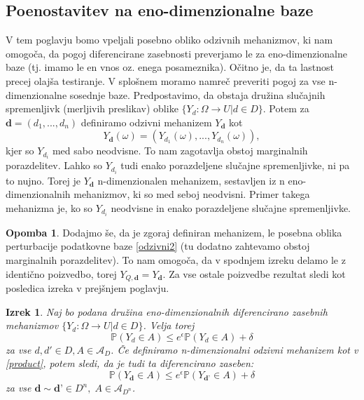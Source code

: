 \documentclass[12pt,a4paper]{amsart}
\theoremstyle{definition} %
\newtheorem{opomba}[definicija]{Opomba}
\theoremstyle{plain} %
\newtheorem{izrek}[definicija]{Izrek}
\begin{document}
\subsection{Poenostavitev na eno-dimenzionalne baze}
V tem poglavju bomo vpeljali posebno obliko odzivnih mehanizmov, ki nam omogoča, da pogoj diferencirane zasebnosti preverjamo le za eno-dimenzionalne baze (tj. imamo le en vnos oz. enega posameznika). Očitno je, da ta lastnost precej olajša testiranje. V splošnem moramo namreč preveriti pogoj za vse n-dimenzionalne sosednje baze.
\newline
\newline
Predpostavimo, da obstaja družina slučajnih spremenljivk (merljivih preslikav) oblike $\{ Y_d: \Omega \rightarrow U | d \in D\}$.  Potem za $\textbf{d} = (d_1,...,d_n)$ definiramo odzivni mehanizem $Y_{\textbf{d}}$ kot  
\begin{equation}\label{product}
Y_{\textbf{d}} (\omega) = (Y_{d_1} (\omega) , ... , Y_{d_n} (\omega)), \tag{5}
\end{equation}
kjer so $Y_{d_i}$ med sabo neodvisne. To nam zagotavlja obstoj marginalnih porazdelitev.  Lahko so $Y_{d_i}$ tudi enako porazdeljene slučajne spremenljivke, ni pa to nujno. Torej je $Y_{\textbf{d}}$ n-dimenzionalen mehanizem, sestavljen iz n eno-dimenzionalnih mehanizmov, ki so med seboj neodvisni. Primer takega mehanizma je, ko so $Y_{d_i}$ neodvisne in enako porazdeljene slučajne spremenljivke.
\newline
\newline
\begin{opomba} Dodajmo še, da je zgoraj definiran mehanizem, le posebna oblika perturbacije podatkovne baze \eqref{odzivni2} (tu dodatno zahtevamo obstoj marginalnih porazdelitev). To nam omogoča, da v spodnjem izreku delamo le z identično poizvedbo, torej $Y_{Q, \textbf{d}}=Y_{\textbf{d}}$. Za vse ostale poizvedbe rezultat sledi kot posledica izreka v prejšnjem poglavju. 
\end{opomba}
\begin{izrek} Naj bo podana družina eno-dimenzionalnih diferencirano zasebnih mehanizmov $\{ Y_d: \Omega \rightarrow U | d \in D\}$. Velja torej
$$\mathbb{P}(Y_d \in A) \leq e^\epsilon \mathbb{P}(Y_d \in A) + \delta$$ 
za vse $d,d' \in D, A \in \mathcal{A}_D$. Če definiramo n-dimenzionalni odzivni mehanizem kot v \eqref{product}, potem sledi, da je tudi ta diferencirano zaseben:
$$\mathbb{P}(Y_{\textbf{d}} \in A) \leq e^\epsilon \mathbb{P}(Y_{\textbf{d'}} \in A) + \delta$$
za vse $\textbf{d} \sim \textbf{d'} \in D^n, \; A \in \mathcal{A}_{D^n}$.
\end{izrek}
\end{document}
